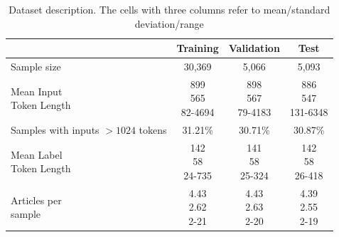 \documentclass[12pt, twocolumn]{article}
\numberwithin{equation}{section}
\begin{document}
\begin{table}
    \small
    \begin{tabular}{|l|c|c|c|}
    \hline
        ~ & Training & Validation & Test  
        \\ \hline
        Sample size & 30,369 & 5,066 & 5,093 
	\\ \hline
        \shortstack{Mean Input\\Token Length}
	    & \shortstack{899 \\ 565 \\ 82-4694}
	    & \shortstack{898 \\ 567 \\ 79-4183}
	    & \shortstack{886 \\ 547 \\ 131-6348}
	\\ \hline
        \shortstack{Samples with\\inputs $>1024$\\tokens} & 31.21\% & 30.71\% & 30.87\% 
        \\ \hline
        \shortstack{Mean Label\\Token Length}
	    & \shortstack{142 \\ 58 \\ 24-735}
	    & \shortstack{141 \\ 58 \\ 25-324}
	    & \shortstack{142 \\ 58 \\ 26-418}
	\\ \hline
        \shortstack{Articles per\\sample}
	    & \shortstack{4.43 \\ 2.62 \\ 2-21}
	    & \shortstack{4.43 \\ 2.63 \\ 2-20}
	    & \shortstack{4.39 \\ 2.55 \\ 2-19}
	 \\ \hline
    \end{tabular}
    \caption{Dataset description. The cells with three columns refer to mean/standard deviation/range}
\end{table}
\end{document}
